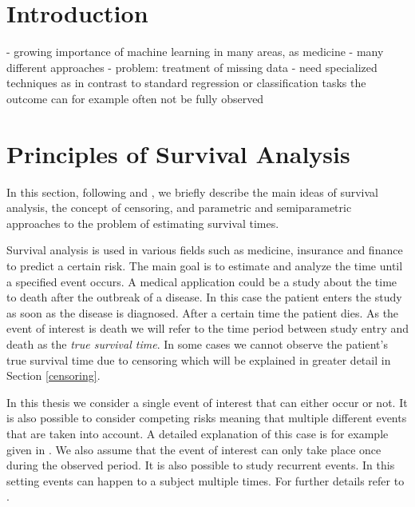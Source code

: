 \documentclass[12pt, a4paper]{scrartcl}
\theoremstyle{definition}
\theoremstyle{plain}
\numberwithin{equation}{section}
\numberwithin{figure}{section}
\numberwithin{table}{section}
\begin{document}
	
	\thispagestyle{plain}
	\tableofcontents
	\newpage

	
	\section{Introduction} \label{introduction}
	- growing importance of machine learning in many areas, as medicine
	- many different approaches
	- problem: treatment of missing data
	- need specialized techniques as in contrast to standard regression or classification tasks the outcome can for example often not be fully observed
	
	\newpage
	
	\section{Principles of Survival Analysis}
		
	In this section, following \citet*{sabook} and \citet*{mathsabook}, we briefly describe the main ideas of survival analysis, the concept of censoring, and parametric and semiparametric approaches to the problem of estimating survival times.
	
	Survival analysis is used in various fields such as medicine, insurance and finance to predict a certain risk.
	The main goal is to estimate and analyze the time until a specified event occurs.
	A medical application could be a study about the time to death after the outbreak of a disease.
	In this case the patient enters the study as soon as the disease is diagnosed.
	After a certain time the patient dies.
	As the event of interest is death we will refer to the time period between study entry and death as the \emph{true survival time}.
	In some cases we cannot observe the patient's true survival time due to censoring which will be explained in greater detail in Section \ref{censoring}.
	
	In this thesis we consider a single event of interest that can either occur or not.
	It is also possible to consider competing risks meaning that multiple different events that are taken into account.
	A detailed explanation of this case is for example given in \citet*[Chapter~8]{bookfailuretime}.
	We also assume that the event of interest can only take place once during the observed period.
	It is also possible to study recurrent events.
	In this setting events can happen to a subject multiple times.
	For further details refer to \citet*[Chapter~9]{bookfailuretime}.
	
\end{document}
